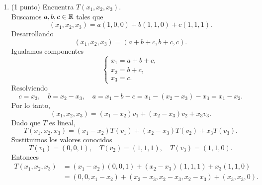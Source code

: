 \documentclass[12pt,a4paper]{article}
\begin{document}
    \begin{solucion}
        \begin{enumerate}
            \item[(a)] (1 punto) Encuentra $T(x_{1},x_{2},x_{3})$.\\
            Buscamos $a,b,c\in\mathbb{R}$ tales que
            \begin{equation*}
                (x_{1},x_{2},x_{3})=a(1,0,0)+b(1,1,0)+c(1,1,1).
            \end{equation*}
            Desarrollando
            \begin{equation*}
                (x_{1},x_{2},x_{3})=(a+b+c,b+c,c).
            \end{equation*}
            Igualamos componentes
            \begin{equation*}
                \begin{cases}
                    x_{1}=a+b+c,\\
                    x_{2}=b+c,\\
                    x_{3}=c.
                \end{cases}
            \end{equation*}
            Resolviendo
            \begin{equation*}
                c=x_{3},\quad b=x_{2}-x_{3},\quad a=x_{1}-b-c=x_{1}-(x_{2}-x_{3})-x_{3}=x_{1}-x_{2}.
            \end{equation*}
            Por lo tanto,
            \begin{equation*}
                (x_{1},x_{2},x_{3})=(x_{1}-x_{2})v_{1}+(x_{2}-x_{3})v_{2}+x_{3}v_{3}.
            \end{equation*}
            Dado que $T$ es lineal,
            \begin{equation*}
                T(x_{1},x_{2},x_{3})=(x_{1}-x_{2})T(v_{1})+(x_{2}-x_{3})T(v_{2})+x_{3}T(v_{3}).
            \end{equation*}
            Sustituimos los valores conocidos
            \begin{equation*}
                T(v_{1})=(0,0,1),\quad T(v_{2})=(1,1,1),\quad T(v_{3})=(1,1,0).
            \end{equation*}
            Entonces
            \begin{align*}
                T(x_{1},x_{2},x_{3})&=(x_{1}-x_{2})(0,0,1)+(x_{2}-x_{3})(1,1,1)+x_{3}(1,1,0)\\
                &=(0,0,x_{1}-x_{2})+(x_{2}-x_{3},x_{2}-x_{3},x_{2}-x_{3})+(x_{3},x_{3},0).
            \end{align*}

\end{enumerate}
\end{solucion}
\end{document}
